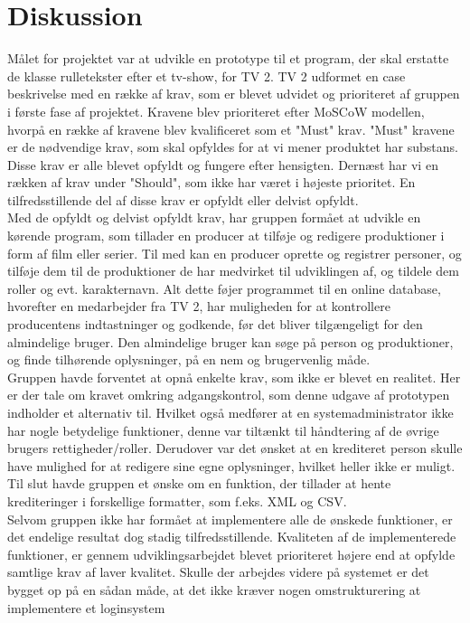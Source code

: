\section{Diskussion}

Målet for projektet var at udvikle en prototype til et program, der skal erstatte de klasse rulletekster efter et tv-show, for TV 2. TV 2 udformet en case beskrivelse med en række af krav, som er blevet udvidet og prioriteret af gruppen i første fase af projektet. Kravene blev prioriteret efter MoSCoW modellen, hvorpå en række af kravene blev kvalificeret som et "Must" krav. "Must" kravene er de nødvendige krav, som skal opfyldes for at vi mener produktet har substans. Disse krav er alle blevet opfyldt og fungere efter hensigten. Dernæst har vi en rækken af krav under "Should", som ikke har været i højeste prioritet. En tilfredsstillende del af disse krav er opfyldt eller delvist opfyldt. \\
Med de opfyldt og delvist opfyldt krav, har gruppen formået at udvikle en kørende program, som tillader en producer at tilføje og redigere produktioner i form af film eller serier. Til med kan en producer oprette og registrer personer, og tilføje dem til de produktioner de har medvirket til udviklingen af, og tildele dem roller og evt. karakternavn. Alt dette føjer programmet til en online database, hvorefter en medarbejder fra TV 2, har muligheden for at kontrollere producentens indtastninger og godkende, før det bliver tilgængeligt for den almindelige bruger. Den almindelige bruger kan søge på person og produktioner, og finde tilhørende oplysninger, på en nem og brugervenlig måde. \\
Gruppen havde forventet at opnå enkelte krav, som ikke er blevet en realitet. Her er der tale om kravet omkring adgangskontrol, som denne udgave af prototypen indholder et alternativ til. Hvilket også medfører at en systemadministrator ikke har nogle betydelige funktioner, denne var tiltænkt til håndtering af de øvrige brugers rettigheder/roller. Derudover var det ønsket at en krediteret person skulle have mulighed for at redigere sine egne oplysninger, hvilket heller ikke er muligt. Til slut havde gruppen et ønske om en funktion, der tillader at hente krediteringer i forskellige formatter, som f.eks. XML og CSV. \\
Selvom gruppen ikke har formået at implementere alle de ønskede funktioner, er det endelige resultat dog stadig tilfredsstillende. Kvaliteten af de implementerede funktioner, er gennem udviklingsarbejdet blevet prioriteret højere end at opfylde samtlige krav af laver kvalitet. Skulle der arbejdes videre på systemet er det bygget op på en sådan måde, at det ikke kræver nogen omstrukturering at implementere et loginsystem  